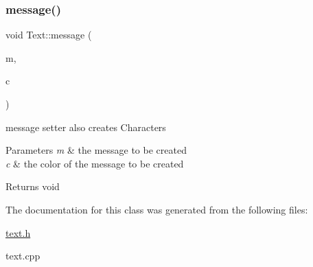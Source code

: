 \subsubsection{\texorpdfstring{message()}{message()}\hspace{0.1cm}{\footnotesize\ttfamily [3/3]}}
{\footnotesize\ttfamily void Text\+::message (\begin{DoxyParamCaption}\item[{std\+::string}]{m,  }\item[{\hyperlink{struct_r_g_b_a_color}{R\+G\+B\+A\+Color}}]{c }\end{DoxyParamCaption})}



message setter also creates Characters 


\begin{DoxyParams}{Parameters}
{\em m} & the message to be created \\
\hline
{\em c} & the color of the message to be created \\
\hline
\end{DoxyParams}
\begin{DoxyReturn}{Returns}
void 
\end{DoxyReturn}


The documentation for this class was generated from the following files\+:\begin{DoxyCompactItemize}
\item 
\hyperlink{text_8h}{text.\+h}\item 
text.\+cpp\end{DoxyCompactItemize}
